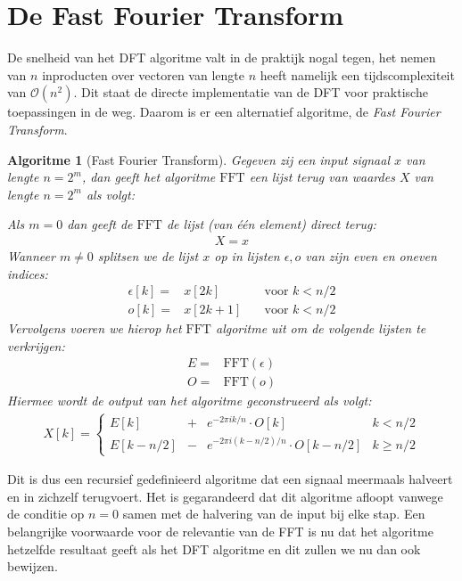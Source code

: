 \documentclass[11pt]{report}
\newcommand{\e}{\epsilon}
\renewcommand{\O}{\mathcal{O}}
\newcommand{\FFT}{\text{FFT}}
\newtheorem*{algo}{Algoritme}
\theoremstyle{remark}
\newcommand{\eq}[1]{\begin{eqnarray*} #1 \end{eqnarray*}}
\newcommand{\dpii}{{2\pi i}}
\begin{document}
\section{De Fast Fourier Transform}
De snelheid van het DFT algoritme valt in de praktijk nogal tegen, het nemen van $n$ inproducten over vectoren 
van lengte $n$ heeft namelijk een tijdscomplexiteit van $\O(n^2)$. Dit staat de directe implementatie van de DFT 
voor praktische toepassingen in de weg. Daarom is er een alternatief algoritme, de \emph{Fast Fourier Transform}.  \bigskip

\begin{algo}[Fast Fourier Transform]
Gegeven zij een input signaal $x$ van lengte $n=2^m$, dan geeft het algoritme $\FFT$ 
een lijst terug van waardes $X$ van lengte $n=2^m$ als volgt:

Als $m=0$ dan geeft de $\FFT$ de lijst (van \'e\'en element) direct terug:
\eq{
X = x
}
Wanneer $m\neq0$ splitsen we de lijst $x$ op in lijsten $\e,o$ van zijn even en oneven indices:
\eq{
  \e[k]   =& x[2k]   &\quad \text{voor } k < n/2\\
   o[k]   =& x[2k+1] &\quad \text{voor } k < n/2
}
Vervolgens voeren we hierop het $\FFT$ algoritme uit om de volgende lijsten te verkrijgen:
\eq{
  E =& \FFT(\e) \\
  O =& \FFT(o)
}
Hiermee wordt de output van het algoritme geconstrueerd als volgt:
\eq{
  X[k] = \left\{\begin{array}{llll}
    E[k]         &+& e^{-\dpii k/n}\cdot O[k] &  k< n/2 \\
    E[k-n/2] &-& e^{-\dpii (k-n/2)/n}\cdot O[k-n/2] &  k\geq n/2 
  \end{array}\right.
}
\end{algo}

Dit is dus een recursief gedefinieerd algoritme dat een signaal meermaals halveert en in zichzelf terugvoert.
Het is gegarandeerd dat dit algoritme afloopt vanwege de conditie op $n=0$ samen met de halvering van de input bij elke stap. Een belangrijke voorwaarde voor de relevantie van de FFT is nu dat het algoritme hetzelfde resultaat geeft als het DFT algoritme en dit zullen we nu dan ook bewijzen. 
\end{document}
